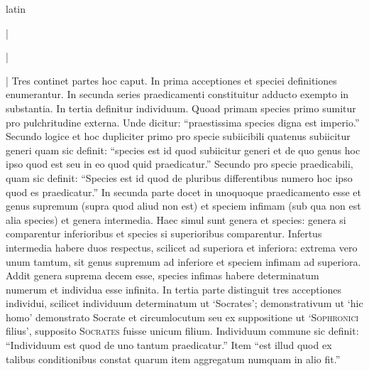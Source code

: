 \begin{otherlanguage*}{latin}
\pstart
{}
\pend

\pstart
\textnormal{|}  
\pend

\pstart
\textnormal{|}  
\pend

\pstart
{}
\pend

\pstart
\textnormal{|} Tres continet partes hoc caput. In prima acceptiones et speciei definitiones enumerantur. In secunda series praedicamenti constituitur adducto exempto in substantia. In tertia definitur individuum. Quoad primam species primo sumitur pro pulchritudine externa. Unde dicitur:
\enquote{praestissima species digna est imperio.} Secundo logice et hoc dupliciter primo pro specie subiicibili quatenus subiicitur generi quam sic definit:
\enquote{species est id quod subiicitur generi et de quo genus hoc ipso quod est seu in eo quod quid praedicatur.} Secundo pro specie praedicabili, quam sic definit:
\enquote{Species est id quod de pluribus differentibus numero hoc ipso quod es praedicatur.} In secunda parte docet in unoquoque praedicamento esse et genus supremum (supra quod aliud non est) et speciem infimam (sub qua non est alia species) et genera intermedia. Haec simul sunt genera et species:
genera si comparentur inferioribus et species si superioribus comparentur. Infertus intermedia habere duos respectus, scilicet ad superiora et inferiora:
extrema vero unum tamtum, sit genus supremum ad inferiore et speciem infimam ad superiora. Addit genera suprema decem esse, species infimas habere determinatum numerum et individua esse infinita. In tertia parte distinguit tres acceptiones individui, scilicet individuum determinatum ut `Socrates'; demonstrativum ut `hic homo' demonstrato Socrate et circumlocutum seu ex suppositione ut `\textsc{Sophronici} filius', supposito \textsc{Socrates} fuisse unicum filium. Individuum commune sic definit:
\enquote{Individuum est quod de uno tantum praedicatur.} Item \enquote{est illud quod ex talibus conditionibus constat quarum item aggregatum numquam in alio fit.} 
\pend


\end{otherlanguage*}

